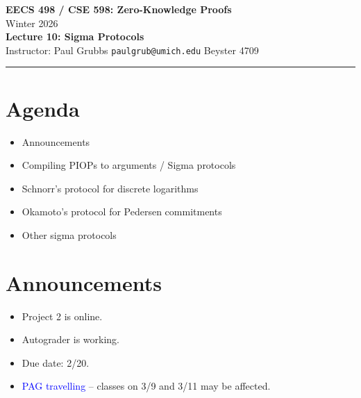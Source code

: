 \documentclass[11pt]{article}
\begin{document}
\begin{center}
  {\LARGE \textbf{EECS 498 / CSE 598: Zero-Knowledge Proofs}}\\[6pt]
  {\large Winter 2026}\\[4pt]
  {\large \textbf{Lecture 10: Sigma Protocols}}\\[4pt]
  {\large Instructor: Paul Grubbs \quad \texttt{paulgrub@umich.edu} \quad Beyster 4709}
\end{center}
\hrule
\vspace{1em}

\section*{Agenda}
\begin{itemize}
  \item Announcements
  \item Compiling PIOPs to arguments / Sigma protocols
  \item Schnorr's protocol for discrete logarithms
  \item Okamoto's protocol for Pedersen commitments
  \item Other sigma protocols
\end{itemize}

\section{Announcements}

\begin{itemize}
  \item Project 2 is online.
  \item Autograder is working.
  \item Due date: 2/20.
  \item \textcolor{blue}{PAG travelling} -- classes on 3/9 and 3/11 may be affected.
\end{itemize}

\end{document}
